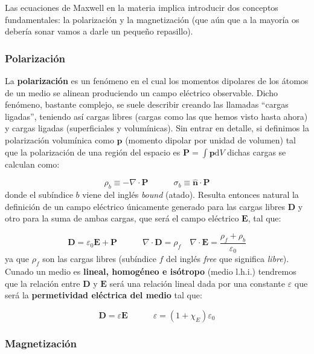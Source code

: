 \documentclass[12pt]{article}
\newcommand{\D}{\mathrm{d}}
\newcommand{\tquad}{\quad \quad \quad}
\newcommand{\dive}{\nabla \cdot}
\newcommand{\En}{\mathbf{E}}
\newcommand{\Dn}{\mathbf{D}}
\newcommand{\Pn}{\mathbf{P}}
\newcommand{\pn}{\mathbf{p}}
\newcommand{\hnn}{\hat{\mathbf{n}}}
\numberwithin{equation}{section}
\numberwithin{figure}{section}
\begin{document}
Las ecuaciones de Maxwell en la materia implica introducir dos conceptos fundamentales: la polarización y la magnetización (que aún que a la mayoría os debería sonar vamos a darle un pequeño repasillo). \\

\subsubsection{Polarización}

La \textbf{polarización} es un fenómeno en el cual los momentos dipolares de los átomos de un medio se alinean produciendo un campo eléctrico observable. Dicho fenómeno, bastante complejo, se suele describir creando las llamadas ``cargas ligadas'', teniendo así cargas libres (cargas como las que hemos visto hasta ahora) y cargas ligadas (superficiales y volumínicas). Sin entrar en detalle, si definimos la polarización volumínica como $\pn$ (momento dipolar por unidad de volumen) tal que la polarización de una región del espacio es $\Pn = \int \pn \D V$ dichas cargas se calculan como:

\begin{equation}
\rho_{b} \equiv - \dive \Pn \tquad \sigma_b \equiv \hnn \cdot \Pn
\end{equation}
donde el subíndice $b$ viene del inglés \textit{bound} (atado). Resulta entonces natural la definición de un campo eléctrico únicamente generado para las cargas libres $\Dn$ y otro para la suma de ambas cargas, que será el campo eléctrico $\En$, tal que:

\begin{equation}
\Dn = \varepsilon_0 \En + \Pn \tquad \dive \Dn = \rho_f \quad \dive \En = \dfrac{\rho_f + \rho_b}{\varepsilon_0}
\end{equation}
ya que $\rho_f$ son las cargas libres (subíndice $f$ del inglés \textit{free} que significa \textit{libre}). Cunado un medio es \textbf{lineal, homogéneo e isótropo} (medio l.h.i.) tendremos que la relación entre $\Dn$ y $\En$ será una relación lineal dada por una constante $\varepsilon$ que será la \textbf{permetividad eléctrica del medio} tal que:

\begin{equation}
\Dn = \varepsilon \En \tquad \varepsilon = (1+\chi_E) \varepsilon_0
\end{equation}

\subsubsection{Magnetización}
\end{document}
